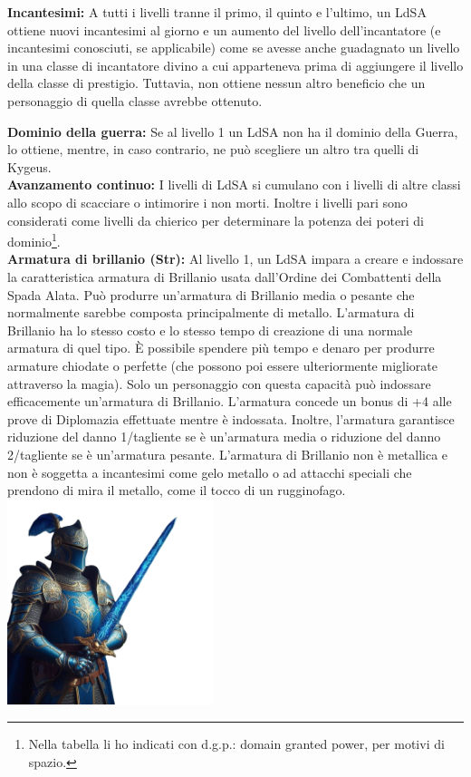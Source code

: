 \documentclass[10pt, a4paper]{report}
\begin{document}
\begin{multicols}{2}
\textbf{Incantesimi:} A tutti i livelli tranne il primo, il quinto e l’ultimo, un LdSA ottiene nuovi incantesimi al giorno e un aumento del livello dell'incantatore (e incantesimi conosciuti, se applicabile) come se avesse anche guadagnato un livello in una classe di incantatore divino a cui apparteneva prima di aggiungere il livello della classe di prestigio. Tuttavia, non ottiene nessun altro beneficio che un personaggio di quella classe avrebbe ottenuto. 

\textbf{Dominio della guerra:}  Se al livello 1 un LdSA non ha il dominio della Guerra, lo ottiene, mentre, in caso contrario, ne può scegliere un altro tra quelli di Kygeus.\\

\textbf{Avanzamento continuo:}  I livelli di LdSA si cumulano con i livelli di altre classi allo scopo di scacciare o intimorire i non morti. Inoltre i livelli pari sono considerati come livelli da chierico per determinare la potenza dei poteri di dominio\footnote{Nella tabella li ho indicati con d.g.p.: domain granted power, per motivi di spazio.}.\\

\textbf{Armatura di brillanio (Str):}  Al livello 1, un LdSA impara a creare e indossare la caratteristica armatura di Brillanio usata dall'Ordine dei Combattenti della Spada Alata. Può produrre un'armatura di Brillanio media o pesante che normalmente sarebbe composta principalmente di metallo. L'armatura di Brillanio ha lo stesso costo e lo stesso tempo di creazione di una normale armatura di quel tipo. È possibile spendere più tempo e denaro per produrre armature chiodate o perfette (che possono poi essere ulteriormente migliorate attraverso la magia). Solo un personaggio con questa capacità può indossare efficacemente un'armatura di Brillanio. L'armatura concede un bonus di +4 alle prove di Diplomazia effettuate mentre è indossata. Inoltre, l'armatura garantisce riduzione del danno 1/tagliente se è un'armatura media o riduzione del danno 2/tagliente se è un'armatura pesante. L'armatura di Brillanio non è metallica e non è soggetta a incantesimi come gelo metallo o ad attacchi speciali che prendono di mira il metallo, come il tocco di un rugginofago.\\

\includegraphics[width=6cm]{ldsa.png}


\end{multicols}
\end{document}
